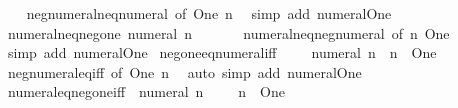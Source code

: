 \begin{isabellebody}
%
\isadelimproof
\ \ %
\endisadelimproof
%
\isatagproof
{}\isamarkupfalse%
\ neg{\isacharunderscore}{\kern0pt}numeral{\isacharunderscore}{\kern0pt}neq{\isacharunderscore}{\kern0pt}numeral\ {\isacharbrackleft}{\kern0pt}of\ One\ n{\isacharbrackright}{\kern0pt}\ \isamarkupfalse%
\ {\isacharparenleft}{\kern0pt}simp\ add{\isacharcolon}{\kern0pt}\ numeral{\isacharunderscore}{\kern0pt}One{\isacharparenright}{\kern0pt}%
\endisatagproof
{\isafoldproof}%
%
\isadelimproof
\isanewline
%
\endisadelimproof
\isanewline
{}\isamarkupfalse%
\ numeral{\isacharunderscore}{\kern0pt}neq{\isacharunderscore}{\kern0pt}neg{\isacharunderscore}{\kern0pt}one{\isacharcolon}{\kern0pt}\ {\isachardoublequoteopen}numeral\ n\ {\isasymnoteq}\ {\isacharminus}{\kern0pt}\ {}{\isachardoublequoteclose}\isanewline
%
\isadelimproof
\ \ %
\endisadelimproof
%
\isatagproof
{}\isamarkupfalse%
\ numeral{\isacharunderscore}{\kern0pt}neq{\isacharunderscore}{\kern0pt}neg{\isacharunderscore}{\kern0pt}numeral\ {\isacharbrackleft}{\kern0pt}of\ n\ One{\isacharbrackright}{\kern0pt}\ \isamarkupfalse%
\ {\isacharparenleft}{\kern0pt}simp\ add{\isacharcolon}{\kern0pt}\ numeral{\isacharunderscore}{\kern0pt}One{\isacharparenright}{\kern0pt}%
\endisatagproof
{\isafoldproof}%
%
\isadelimproof
\isanewline
%
\endisadelimproof
\isanewline
{}\isamarkupfalse%
\ neg{\isacharunderscore}{\kern0pt}one{\isacharunderscore}{\kern0pt}eq{\isacharunderscore}{\kern0pt}numeral{\isacharunderscore}{\kern0pt}iff{\isacharcolon}{\kern0pt}\ {\isachardoublequoteopen}{\isacharminus}{\kern0pt}\ {}\ {\isacharequal}{\kern0pt}\ {\isacharminus}{\kern0pt}\ numeral\ n\ {\isasymlongleftrightarrow}\ n\ {\isacharequal}{\kern0pt}\ One{\isachardoublequoteclose}\isanewline
%
\isadelimproof
\ \ %
\endisadelimproof
%
\isatagproof
{}\isamarkupfalse%
\ neg{\isacharunderscore}{\kern0pt}numeral{\isacharunderscore}{\kern0pt}eq{\isacharunderscore}{\kern0pt}iff\ {\isacharbrackleft}{\kern0pt}of\ One\ n{\isacharbrackright}{\kern0pt}\ \isamarkupfalse%
\ {\isacharparenleft}{\kern0pt}auto\ simp\ add{\isacharcolon}{\kern0pt}\ numeral{\isacharunderscore}{\kern0pt}One{\isacharparenright}{\kern0pt}%
\endisatagproof
{\isafoldproof}%
%
\isadelimproof
\isanewline
%
\endisadelimproof
\isanewline
{}\isamarkupfalse%
\ numeral{\isacharunderscore}{\kern0pt}eq{\isacharunderscore}{\kern0pt}neg{\isacharunderscore}{\kern0pt}one{\isacharunderscore}{\kern0pt}iff{\isacharcolon}{\kern0pt}\ {\isachardoublequoteopen}{\isacharminus}{\kern0pt}\ numeral\ n\ {\isacharequal}{\kern0pt}\ {\isacharminus}{\kern0pt}\ {}\ {\isasymlongleftrightarrow}\ n\ {\isacharequal}{\kern0pt}\ One{\isachardoublequoteclose}\isanewline

\end{isabellebody}
